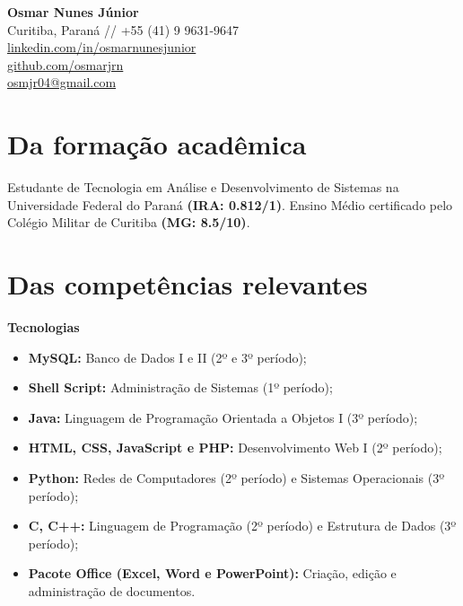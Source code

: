 \documentclass[a4paper,11pt]{article}
\begin{document}
\begin{center}
    {\LARGE \textbf{Osmar Nunes Júnior}} \\ \vspace{0.2cm}
    Curitiba, Paraná // +55 (41) 9 9631-9647 \\
    \href{https://www.linkedin.com/in/osmarnunesjunior}{linkedin.com/in/osmarnunesjunior} \\
    \href{https://www.github.com/osmarjrn}{github.com/osmarjrn} \\
    \href{mailto:osmjr04@gmail.com}{osmjr04@gmail.com}
\end{center}

\vspace{0.5cm}

\section*{Da formação acadêmica}
Estudante de Tecnologia em Análise e Desenvolvimento de Sistemas na Universidade Federal do Paraná \textbf{(IRA: 0.812/1)}. Ensino Médio certificado pelo Colégio Militar de Curitiba \textbf{(MG: 8.5/10)}.

\section*{Das competências relevantes}
\textbf{Tecnologias}
\begin{itemize}[noitemsep, label={--}]
   \item \textbf{MySQL:} Banco de Dados I e II (2º e 3º período);
\item \textbf{Shell Script:} Administração de Sistemas (1º período);
\item \textbf{Java:} Linguagem de Programação Orientada a Objetos I (3º período);
\item \textbf{HTML, CSS, JavaScript e PHP:} Desenvolvimento Web I (2º período);
\item \textbf{Python:} Redes de Computadores (2º período) e Sistemas Operacionais (3º período);
\item \textbf{C, C++:} Linguagem de Programação (2º período) e Estrutura de Dados (3º período);
\item \textbf{Pacote Office (Excel, Word e PowerPoint):} Criação, edição e administração de documentos.
\end{itemize}
\end{document}
